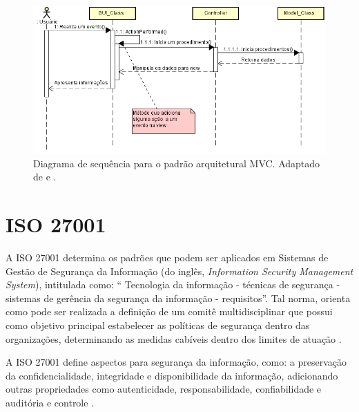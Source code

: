 \begin{figure}[h!]
	\centering
	\includegraphics[keepaspectratio=true,scale=0.8]{figuras/DiagramaDeSequenciaMVC.PNG}
	\caption{Diagrama de sequência para o padrão arquitetural MVC. Adaptado de \cite{durelli2008proposta} e \cite{buschmann1996system}.}
	\label{DiagramaDeSequenciaMVC}
\end{figure}

\section{ISO 27001}
\label{sec:iso27001}

A ISO 27001 determina os padrões que podem ser aplicados em Sistemas de Gestão de Segurança da Informação (do inglês, \textit{Information Security Management System}), intitulada como: “ Tecnologia da informação - técnicas de segurança - sistemas de gerência da segurança da informação - requisitos”. Tal norma, orienta como pode ser realizada a definição de um comitê multidisciplinar que possui como objetivo principal estabelecer as políticas de segurança dentro das organizações, determinando as medidas cabíveis dentro dos limites de atuação \cite{documentation2005information}.

A ISO 27001 define aspectos para segurança da informação, como: a preservação da confidencialidade, integridade e disponibilidade da informação, adicionando outras propriedades como autenticidade, responsabilidade, confiabilidade e auditória e controle \cite{documentation2005information}. 

